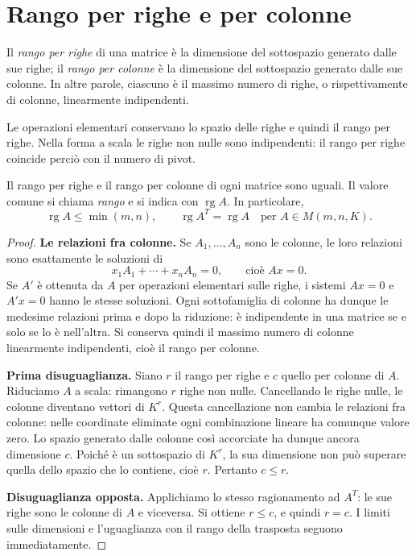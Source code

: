 \section{Rango per righe e per colonne}
\begin{definizione}
Il \emph{rango per righe} di una matrice è la dimensione del sottospazio generato dalle sue righe; il \emph{rango per colonne} è la dimensione del sottospazio generato dalle sue colonne. In altre parole, ciascuno è il massimo numero di righe, o rispettivamente di colonne, linearmente indipendenti.
\end{definizione}
Le operazioni elementari conservano lo spazio delle righe e quindi il rango per righe. Nella forma a scala le righe non nulle sono indipendenti: il rango per righe coincide perciò con il numero di pivot.

\begin{teorema}
Il rango per righe e il rango per colonne di ogni matrice sono uguali. Il valore comune si chiama \emph{rango} e si indica con $\operatorname{rg}A$. In particolare,
\[
 \operatorname{rg}A\leq\min(m,n),\qquad \operatorname{rg}A^T=\operatorname{rg}A
 \quad\text{per }A\in M(m,n,K).
\]
\end{teorema}
\begin{proof}
\textbf{Le relazioni fra colonne.} Se $A_1,\ldots,A_n$ sono le colonne, le loro relazioni sono esattamente le soluzioni di
\[
 x_1A_1+\cdots+x_nA_n=0,\qquad\text{cioè }Ax=0.
\]
Se $A'$ è ottenuta da $A$ per operazioni elementari sulle righe, i sistemi $Ax=0$ e $A'x=0$ hanno le stesse soluzioni. Ogni sottofamiglia di colonne ha dunque le medesime relazioni prima e dopo la riduzione: è indipendente in una matrice se e solo se lo è nell'altra. Si conserva quindi il massimo numero di colonne linearmente indipendenti, cioè il rango per colonne.

\textbf{Prima disuguaglianza.} Siano $r$ il rango per righe e $c$ quello per colonne di $A$. Riduciamo $A$ a scala: rimangono $r$ righe non nulle. Cancellando le righe nulle, le colonne diventano vettori di $K^r$. Questa cancellazione non cambia le relazioni fra colonne: nelle coordinate eliminate ogni combinazione lineare ha comunque valore zero. Lo spazio generato dalle colonne così accorciate ha dunque ancora dimensione $c$. Poiché è un sottospazio di $K^r$, la sua dimensione non può superare quella dello spazio che lo contiene, cioè $r$. Pertanto $c\leq r$.

\textbf{Disuguaglianza opposta.} Applichiamo lo stesso ragionamento ad $A^T$: le sue righe sono le colonne di $A$ e viceversa. Si ottiene $r\leq c$, e quindi $r=c$. I limiti sulle dimensioni e l'uguaglianza con il rango della trasposta seguono immediatamente.
\end{proof}

